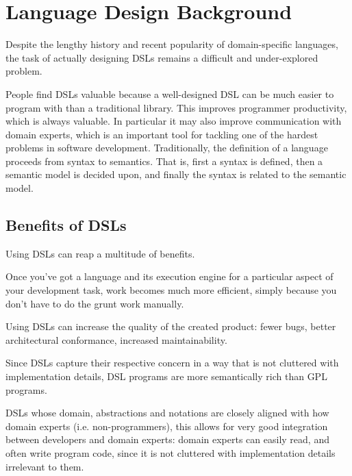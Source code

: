 \section{Language Design Background}
Despite the lengthy history and recent popularity of domain-specific languages, the task of actually
designing DSLs remains a difficult and under-explored problem.

People find DSLs valuable because a well-designed DSL can be much easier to program with than a traditional library. This improves programmer productivity, which is always valuable. In particular it may also improve communication with domain experts, which is an important tool for tackling one of the hardest problems in software development.
Traditionally, the definition of a language proceeds from syntax to semantics. That is, first a syntax is
defined, then a semantic model is decided upon, and finally the syntax is related to the semantic model. 

\subsection{Benefits of DSLs}
Using DSLs can reap a multitude of benefits. 

Once you’ve got a language and its execution engine for a particular aspect of your development task, work becomes much more efficient, simply because you don’t have to do the grunt work manually. 

Using DSLs can increase the quality of the created product: fewer bugs, better architectural conformance, increased maintainability.

Since DSLs capture their respective concern in a way that is not cluttered with implementation details, DSL programs are more semantically rich than GPL programs.

DSLs whose domain, abstractions and notations are closely aligned with how domain experts (i.e. non-programmers), this allows for very good integration between developers and domain experts: domain experts can easily read, and often write program code, since it is not cluttered with implementation details irrelevant to them. 